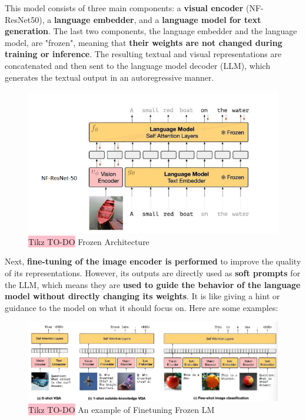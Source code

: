 This model consists of three main components: a \textbf{visual encoder} (NF-ResNet50), a \textbf{language embedder}, and a \textbf{language model for text generation}. The last two components, the language embedder and the language model, are "frozen", meaning that \textbf{their weights are not changed during training or inference}. The resulting textual and visual representations are concatenated and then sent to the language model decoder (LLM), which generates the textual output in an autoregressive manner.

\begin{figure}[!htbp]
    \centering
    \includegraphics[width=0.8\linewidth]{tikz/chapter11 - Frozen LM.png}
    \caption{{\color{red}\colorbox{pink}{Tikz TO-DO}} Frozen Architecture}
\end{figure}

Next, \textbf{fine-tuning of the image encoder is performed} to improve the quality of its representations. However, its outputs are directly used as \textbf{soft prompts} for the LLM, which means they are \textbf{used to guide the behavior of the language model without directly changing its weights}. It is like giving a hint or guidance to the model on what it should focus on. Here are some examples:

\begin{figure}[!htbp]
    \centering
    \includegraphics[width=\linewidth]{tikz/chapter11 - Frozen LM Tasks.png}
    \caption{{\color{red}\colorbox{pink}{Tikz TO-DO}} An example of Finetuning Frozen LM}
\end{figure}

